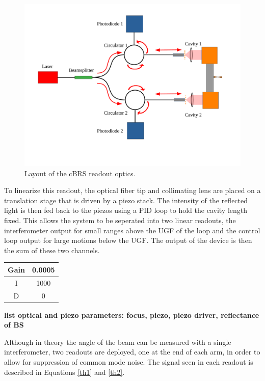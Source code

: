 \documentclass [12pt, proquest]{uwthesis}[2019]
\begin{document}
\begin{figure}[!h]
\begin{center}
\includegraphics[width=\textwidth]{cBRS_OpticalLayout.pdf}
\end{center}
\caption[Layout of the cBRS readout optics]{Layout of the cBRS readout optics.}
\label{cBRSOptLay}
\end{figure}

To linearize this readout, the optical fiber tip and collimating lens are placed on a translation stage that is driven by a piezo stack. The intensity of the reflected light is then fed back to the piezos using a PID loop to hold the cavity length fixed. This allows the system to be seperated into two linear readouts, the interferometer output for small ranges above the UGF of the loop and the control loop output for large motions below the UGF. The output of the device is then the sum of these two channels.

\begin{center}
\begin{tabular}{| c | c |}
\hline
Gain & 0.0005\\
\hline
I & 1000\\
\hline
D & 0\\
\hline
\end{tabular}
\label{pidTable}
\end{center}

\textbf{list optical and piezo parameters: focus, piezo, piezo driver, reflectance of BS}

Although in theory the angle of the beam can be measured with a single interferometer, two readouts are deployed, one at the end of each arm, in order to allow for suppression of common mode noise. The signal seen in each readout is described in Equations \ref{th1} and \ref{th2}. 
\end{document}

